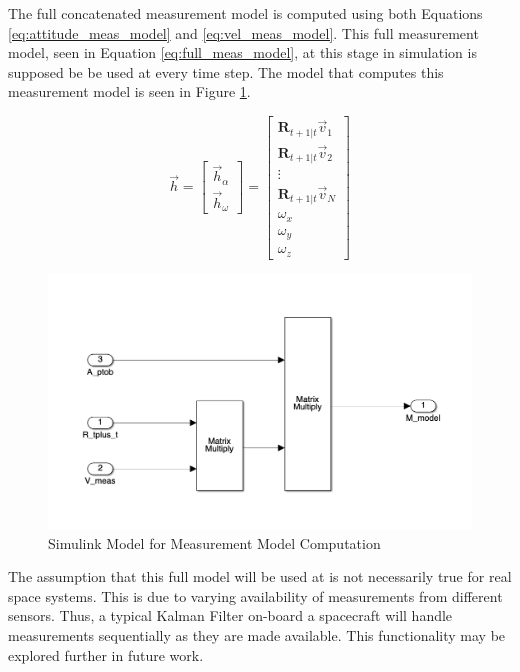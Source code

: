 The full concatenated measurement model is computed using both Equations \ref{eq:attitude_meas_model} and \ref{eq:vel_meas_model}. This full measurement model, seen in Equation \ref{eq:full_meas_model}, at this stage in simulation is supposed be be used at every time step. The model that computes this measurement model is seen in Figure \ref{fig:simulink_meas_model}.

\begin{equation} \label{eq:full_meas_model}
    \vec{h} = \begin{bmatrix}
        \vec{h}_{\alpha} \\ \vec{h}_{\omega}
    \end{bmatrix} = \begin{bmatrix}
        \boldsymbol{R}_{t+1 \vert t} \vec{v}_1 \\
        \boldsymbol{R}_{t+1 \vert t} \vec{v}_2 \\
        \vdots \\
        \boldsymbol{R}_{t+1 \vert t} \vec{v}_N \\
        \omega_x \\
        \omega_y \\
        \omega_z
    \end{bmatrix}
\end{equation}

\begin{figure}[H]
    \centering
    \captionsetup{ justification = centering }
    \includegraphics[width = 12cm]{Images/PS8/meas_model.png}
    \caption{Simulink Model for Measurement Model Computation}
    \label{fig:simulink_meas_model}
\end{figure}

The assumption that this full model will be used at is not necessarily true for real space systems. This is due to varying availability of measurements from different sensors. Thus, a typical Kalman Filter on-board a spacecraft will handle measurements sequentially as they are made available. This functionality may be explored further in future work.


